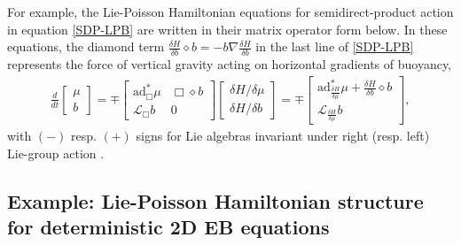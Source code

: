 \documentclass[11pt, oneside]{article}   	%
\numberwithin{equation}{section}
\theoremstyle{plain}
\theoremstyle{definition}
\theoremstyle{remark}
\newcommand{\<}{\langle}
\renewcommand{\>}{\rangle}
\begin{document}
For example, the Lie-Poisson Hamiltonian equations for semidirect-product action in equation \eqref{SDP-LPB} 
are written in their matrix operator form below.
In these equations, the diamond term $\frac{\delta H}{\delta b}\diamond b = - b \nabla \frac{\delta H}{\delta b}$ 
in the last line of \eqref{SDP-LPB} represents the force of vertical gravity acting on horizontal gradients of buoyancy, 
 
  
\begin{align}
\frac{d}{dt} 
\begin{bmatrix}
\mu \\ b
\end{bmatrix}
=
\mp
\begin{bmatrix}
\mathrm{ad}^*_{\Box}\mu & \Box \diamond b 
\\
 \mathcal{L}_\Box b & 0
\end{bmatrix}
\begin{bmatrix}
{\delta H}/{\delta \mu} \\  {\delta H}/{\delta b}
\end{bmatrix}
=
\mp
\begin{bmatrix}
\mathrm{ad}^*_{\frac{\delta H}{\delta \mu}}\mu + \frac{\delta H}{\delta b}\diamond b
\\  \mathcal{L}_{\frac{\delta H}{\delta \mu} } b
\end{bmatrix}
,
\label{SDP-LPB-eqns}
\end{align}
with $(-)$ resp. $(+)$ signs for Lie algebras invariant under right (resp. left) Lie-group action \cite{HolmGM2025}.

\subsection{Example: Lie-Poisson Hamiltonian structure for deterministic 2D EB equations} 
\end{document}
